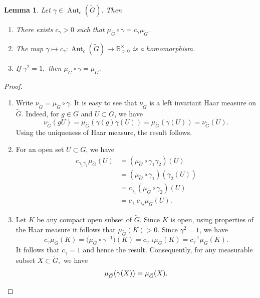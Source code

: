 \documentclass[11pt, a4paper, reqno]{amsart}
\newtheorem{lemma}[theorem]{Lemma}
\theoremstyle{definition}
\theoremstyle{remark}
\theoremstyle{example}
\theoremstyle{note}
\numberwithin{equation}{section}
\DeclareMathOperator{\Aut}{Aut}
\begin{document}
\begin{lemma}\label{results-on-haarmeasure} Let $\gamma\in \Aut_{c}(\widetilde{G})$. Then
\begin{enumerate}
\item[\emph{1)}] There exists $c_{\gamma}>0$ such that $\mu_{\widetilde{G}}\circ \gamma = c_{\gamma}\mu_{\widetilde{G}}.$ 
\smallskip
\item[\emph{2)}] The map $\gamma\longmapsto c_{\gamma}: \Aut_{c}(\widetilde{G}) \longrightarrow \mathbb{R}^{\times}_{>0}$ is a homomorphism.
\smallskip
\item[\emph{3)}]   If $\gamma^{2}=1,$ then  $\mu_{\widetilde{G}}\circ \gamma =\mu_{\widetilde{G}}.$
\end{enumerate}
\end{lemma}

\begin{proof}\hfill 
\begin{enumerate} 
\item[1)] Write $\nu_{\widetilde{G}}=\mu_{\widetilde{G}}\circ\gamma.$
It is easy to see that $\nu_{\widetilde{G}}$ is a left invariant Haar measure on $\widetilde{G}$. Indeed, for $g\in G$ and $U\subset G$, we have
$$\nu_{\widetilde{G}}(gU)=\mu_{\widetilde{G}}(\gamma(g)\gamma(U))=\mu_{\widetilde{G}}(\gamma(U))=\nu_{\widetilde{G}}(U).$$
Using the uniqueness of Haar measure, the result follows. \\

\item[2)] For an open set $U\subset G$, we have
\begin{align*}
c_{\gamma_1\gamma_2}\mu_{\widetilde{G}}(U)
&= (\mu_{\widetilde{G}}\circ\gamma_1\gamma_2)(U)\\
&= (\mu_{\widetilde{G}}\circ\gamma_1)(\gamma_2(U))\\
&= c_{\gamma_1}(\mu_{\widetilde{G}}\circ\gamma_2)(U)\\
&= c_{\gamma_1}c_{\gamma_2}\mu_{\widetilde{G}}(U).
\end{align*}

\item[3)] Let $K$ be any compact open subset of $\widetilde{G}$. Since $K$ is open, using
properties of the Haar measure it follows that $\mu_{\widetilde{G}}(K)>0.$
Since $\gamma^2=1$, we have
$$c_\gamma\mu_{\widetilde{G}}(K)= \bigl(\mu_{\widetilde{G}}\circ\gamma^{-1}\bigr)(K)= c_{\gamma^{-1}}\mu_{\widetilde{G}}(K)= c_\gamma^{-1}\mu_{\widetilde{G}}(K).$$
It follows that $c_\gamma=1$ and hence the result. Consequently, for any
measurable subset $X\subset\widetilde{G},$  we have
\[
\mu_{\widetilde{G}}\bigl(\gamma(X)\bigr)
=
\mu_{\widetilde{G}}(X).  \qedhere
\]
\end{enumerate}
\end{proof}
\end{document}
